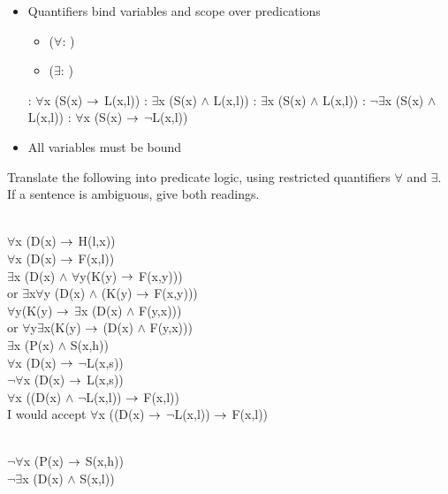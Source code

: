 \documentclass[headrule,footrule]{foils}
\begin{document}

\begin{itemize}
  \item Quantifiers bind variables and scope over predications
    \begin{itemize}
    \item {} ($\forall$: )
    \item {} ($\exists$: )
    \end{itemize}
    \begin{exe}
      \ex {}: $\forall$x (S(x)  $\rightarrow$ L(x,l))
      \ex {}: $\exists$x (S(x)  $\wedge$ L(x,l))
      \ex {}: $\exists$x (S(x)  $\wedge$ L(x,l))
      \ex {}: $\neg\exists$x (S(x)  $\wedge$ L(x,l))
      \ex {}: $\forall$x (S(x)  $\rightarrow$ $\neg$L(x,l))
    \end{exe}
  \item All variables must be bound
\end{itemize}

 Translate the following into predicate logic, using restricted
  quantifiers $\forall$ and $\exists$.  If a sentence is ambiguous,
  give both readings.
 \begin{exe}
    \ex {} \\
    $\forall$x (D(x)  $\rightarrow$ H(l,x))
    \ex {} \\
    $\forall$x (D(x)  $\rightarrow$ F(x,l))
    \ex {} \\
    $\exists$x  (D(x)  $\wedge$ $\forall$y(K(y)  $\rightarrow$ F(x,y)))
    \\ or  $\exists$x$\forall$y (D(x)  $\wedge$ (K(y)  $\rightarrow$ F(x,y)))
 \\   $\forall$y(K(y)   $\rightarrow$ $\exists$x  (D(x)  $\wedge$  F(y,x)))
 \\ or $\forall$y$\exists$x(K(y)   $\rightarrow$   (D(x)  $\wedge$  F(y,x)))
    \ex {} \\
    $\exists$x  (P(x)  $\wedge$ S(x,h))
\newpage
    \ex {} \\
    $\forall$x (D(x)  $\rightarrow$ $\neg$L(x,s))
    \\ $\neg\forall$x (D(x)  $\rightarrow$ L(x,s))
    \ex {} \\
    $\forall$x ((D(x)  $\wedge$ $\neg$L(x,l)) $\rightarrow$  F(x,l))
    \\ I would accept  $\forall$x ((D(x)  $\rightarrow$ $\neg$L(x,l)) $\rightarrow$  F(x,l))

    \ex {} \\
    $\neg\forall$x (P(x)  $\rightarrow$ S(x,h))
    \ex {}
\\
    $\neg\exists$x (D(x)  $\wedge$ S(x,l))
  \end{exe}
\end{document}
